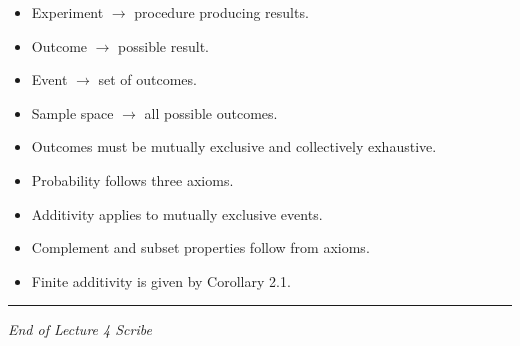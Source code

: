 \documentclass[12pt]{article}
\begin{document}
\begin{itemize}
\item Experiment $\rightarrow$ procedure producing results.
\item Outcome $\rightarrow$ possible result.
\item Event $\rightarrow$ set of outcomes.
\item Sample space $\rightarrow$ all possible outcomes.
\item Outcomes must be mutually exclusive and collectively exhaustive.
\item Probability follows three axioms.
\item Additivity applies to mutually exclusive events.
\item Complement and subset properties follow from axioms.
\item Finite additivity is given by Corollary 2.1.
\end{itemize}

\vfill
\hrule
\centerline{\textit{End of Lecture 4 Scribe}}
\end{document}
